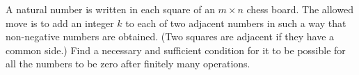 \begin{problem}
    A natural number is written in each square of an $ m \times n$ chess board. The allowed move is to add an integer $ k$ to each of two adjacent numbers in such a way that non-negative numbers are obtained. (Two squares are adjacent if they have a common side.) Find a necessary and sufficient condition for it to be possible for all the numbers to be zero after finitely many operations.

    \label{89ISL19}
\end{problem}